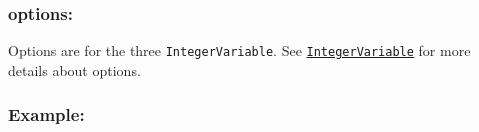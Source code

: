 \subsubsection{options:}
Options are for the three \texttt{IntegerVariable}. See \hyperlink{integervariable}{\tt IntegerVariable} for more details about options.

\subsubsection{Example:}
 
